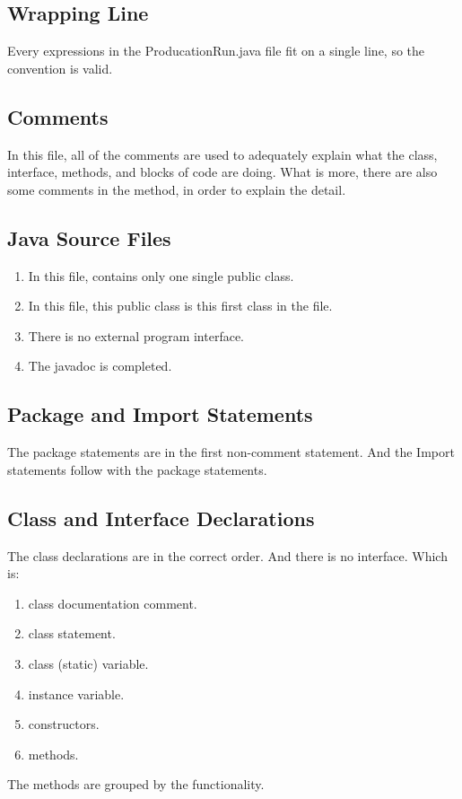 \documentclass{article}
\begin{document}
\subsection{Wrapping Line}
Every expressions in the ProducationRun.java file fit on a single line, so the convention is valid.

\subsection{Comments}
In this file, all of the comments are used to adequately explain what the class, interface, methods, and blocks of code are doing.
What is more, there are also some comments in the method, in order to explain the detail.

\subsection{Java Source Files}
\begin{enumerate}
	\item In this file, contains only one single public class. \newline
	\item In this file, this public class is this first class in the file. \newline
	\item There is no external program interface. \newline
	\item The javadoc is completed.
\end{enumerate}

\subsection{Package and Import Statements}
The package statements are in the first non-comment statement.\newline
And the Import statements follow with the package statements.

\subsection{Class and Interface Declarations}
The class declarations are in the correct order. And there is no interface.\newline
Which is:\newline
\begin{enumerate}
	\item class documentation comment.
	\item class statement.
	\item class (static) variable.
	\item instance variable.
	\item constructors.
	\item methods.
\end{enumerate}
The methods are grouped by the functionality.\newline
\end{document}
